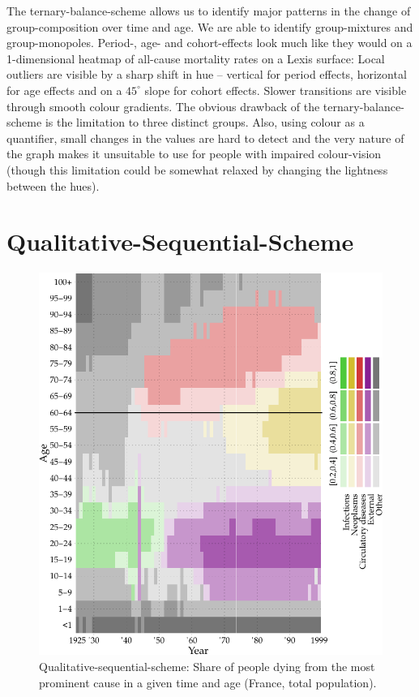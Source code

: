 \documentclass[a4paper, 12pt]{scrartcl}
\begin{document}
The ternary-balance-scheme allows us to identify major patterns in the change of group-composition over time and age. We are able to identify group-mixtures and group-monopoles. Period-, age- and cohort-effects look much like they would on a 1-dimensional heatmap of all-cause mortality rates on a Lexis surface: Local outliers are visible by a sharp shift in hue -- vertical for period effects, horizontal for age effects and on a $45^{\circ}$ slope for cohort effects. Slower transitions are visible through smooth colour gradients.
The obvious drawback of the ternary-balance-scheme is the limitation to three distinct groups. Also, using colour as a quantifier, small changes in the values are hard to detect and the very nature of the graph makes it unsuitable to use for people with impaired colour-vision (though this limitation could be somewhat relaxed by changing the lightness between the hues).

\clearpage

\section{Qualitative-Sequential-Scheme} %
\label{sec:qss}

\begin{figure}[!htb]
  \centering
  \includegraphics[width = 0.8\linewidth]{../fig/plot-qual_seq.pdf}
  \caption{Qualitative-sequential-scheme: Share of people dying from the most prominent cause in a given time and age (France, total population).}
  \label{fig:qss}
\end{figure}
\end{document}
